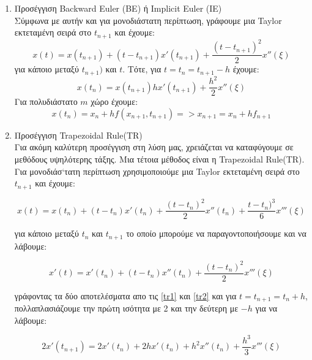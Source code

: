 \begin{enumerate}
  \item Προσέγγιση \textlatin{Backward Euler (BE)} ή \textlatin{Implicit Euler (IE)}\\
        Σύμφωνα με αυτήν και για μονοδιάστατη περίπτωση, γράφουμε μια \textlatin{Taylor} εκτεταμένη σειρά στο $t_{n+1}$ και έχουμε:\\
        \begin{equation}
            x(t) = x(t_{n+1}) + (t - t_{n+1}) x'(t_{n+1}) + \frac{(t - t_{n+1})^2}{2}x''(\xi)
        \end{equation}
        για κάποιο \xi μεταξύ $t_{n+1})$ και $t$. Τότε, για $t = t_n = t_{n+1} - h$ έχουμε:
        \begin{equation}
            x(t_n) = x(t_{n+1}) h x'(t_{n+1}) + \frac{h^2}{2}x''(\xi)
        \end{equation}
        Για πολυδιάστατο $m$ χώρο έχουμε:
        \begin{equation}
            x(t_n) = x_n + h f(x_{n+1}, t_{n+1}) => x_{n+1} = x_n + hf_{n+1}
        \end{equation}
 \item Προσέγγιση \textlatin{Trapezoidal Rule(TR)}\\
    Για ακόμη καλύτερη προσέγγιση στη λύση μας, χρειάζεται να καταφύγουμε σε μεθόδους υψηλότερης τάξης. Μια τέτοια μέθοδος είναι η \textlatin{Trapezoidal Rule(TR)}. Για μονοδιάσ`τατη περίπτωση χρησιμοποιούμε μια \textlatin{Taylor} εκτεταμένη σειρά στο $t_{n+1}$ και έχουμε:
    
    \begin{equation} \label{tr1}
      x(t) = x(t_n) + (t - t_n) x'(t_n) + \frac{(t - t_n)^2}{2}x''(t_n) + \frac{t - t_n)^3}{6} x'''(\xi)
    \end{equation}
    
    για κάποιο \xi μεταξύ $t_n$ και $t_{n+1}$ το οποίο μπορούμε να παραγοντοποιήσουμε και να λάβουμε:
    
    \begin{equation} \label{tr2}
      x'(t) = x'(t_n) + (t - t_n) x''(t_n) + \frac{(t - t_n)^2}{2}x'''(\xi)
    \end{equation}
    
    γράφοντας τα δύο αποτελέσματα απο τις \ref{tr1} και \ref{tr2} και για $t = t_{n+1} = t_n + h$, πολλαπλασιάζουμε την πρώτη ισότητα με 2 και την δεύτερη με $-h$ για να λάβουμε:
    
    \begin{equation}
      2x'(t_{n+1}) = 2x'(t_n) + 2h x'(t_n) + h^2 x''(t_n) + \frac{h^3}{3}x'''(\xi)
    \end{equation}
    

\end{enumerate}
